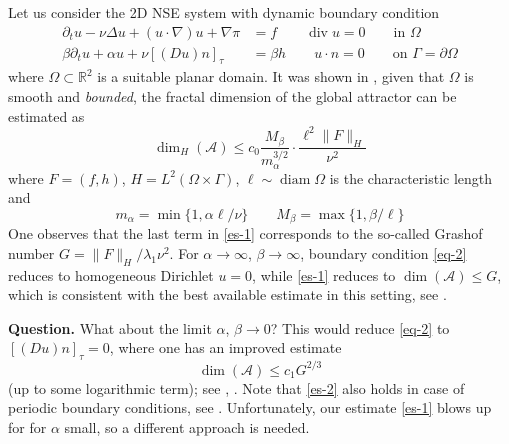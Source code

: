\documentclass[12pt]{article}
\newcommand{\dert}{\partial_t}
\newcommand{\diver}{\operatorname{div}}
\newcommand{\entau}[1]{[({#1})n]_{\tau}}
\newcommand{\rr}{\mathbb R}
\newcommand{\norm}[3]{\lVert #1 \rVert_{#2}^{#3}}
\newcommand{\attr}{\mathcal{A}}
\begin{document}
Let us consider the 2D NSE system with dynamic boundary condition
\begin{align}	\label{eq-1}
\dert u - \nu \Delta u + (u\cdot \nabla) u + \nabla \pi &= f
\qquad \diver{u} = 0 \qquad\textrm{in $\Omega$}
\\		\label{eq-2}
\beta \dert u + \alpha u + \nu \entau{Du} &= \beta h
\qquad u\cdot n = 0 \qquad\textrm{on $\Gamma = \partial \Omega$}
\end{align}
where $\Omega \subset \rr^2$ is a suitable planar domain.
It was shown in \cite{PZ24}, given that $\Omega$ is smooth
and {\it bounded}, the fractal dimension of the global attractor can
be estimated as
\begin{equation}	\label{es-1}
\dim_{H}(\attr) \le c_0 \frac{M_\beta}{m^{3/2}_\alpha}
\cdot \frac{\ell^2\norm{F}{H}{}}{\nu^2}
\end{equation}
where $F=(f,h)$, $H=L^2(\Omega \times \Gamma)$, $
\ell \sim \operatorname{diam}\Omega$ is the characteristic
length  and
\begin{equation}	\label{defMm}
m_\alpha = \min\{1 , \alpha \ell / \nu \}
\qquad
M_\beta = \max\{ 1 , \beta / \ell \}
\end{equation}
One observes that the last term in \eqref{es-1} corresponds
to the so-called Grashof number $G = \norm{F}{H}{} / \lambda_1 \nu^2$.
For $\alpha \to \infty$, $\beta \to \infty$, 
boundary condition \eqref{eq-2} reduces to homogeneous Dirichlet $u=0$,
while \eqref{es-1} reduces to $\dim(\attr) \le G$, which is consistent
with the best available estimate in this setting, see \cite{Te97}.

\par\medskip
{\bf Question.} What about the limit $\alpha$, $\beta \to 0$?
This would reduce \eqref{eq-2} to $\entau{Du} = 0$, where one
has an improved estimate
\begin{equation}	\label{es-2}
\dim(\attr) \le c_1 G^{2/3}
\end{equation}
(up to some logarithmic term); see \cite{Il94}, \cite{Zi98}. 
Note that \eqref{es-2} also holds in case of periodic boundary
conditions, see \cite{Te97}. Unfortunately, our estimate \eqref{es-1} 
blows up for for $\alpha$ small, so a different approach is needed.
\end{document}
